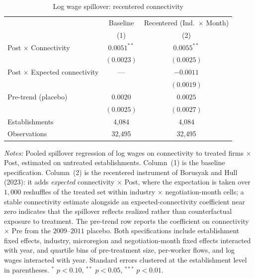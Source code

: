 \begin{table}[H]
\centering
\caption{Log wage spillover: recentered connectivity}
\label{tab:rob_logwages_recentered}
\footnotesize
\begin{tabular}{lcc}
\toprule\toprule
 & Baseline & \shortstack{Recentered\\(Ind.\ $\times$ Month)} \\
 & (1) & (2) \\
\midrule
Post $\times$ Connectivity             & $0.0051^{**}$ & $0.0055^{**}$ \\
                                       & $(0.0023)$ & $(0.0025)$ \\[2pt]
Post $\times$ Expected connectivity    & ---   & $-0.0011$ \\
                                       &       & $(0.0019)$ \\[4pt]
\quad Pre-trend (placebo)              & $0.0020$ & $0.0025$ \\
                                       & $(0.0025)$ & $(0.0027)$ \\
\midrule
Establishments                         & 4,084 & 4,084 \\
Observations                           & 32,495 & 32,495 \\
\bottomrule\bottomrule
\end{tabular}

\begin{minipage}{0.9\linewidth}
\scriptsize\vspace{4pt}
\textit{Notes:} Pooled spillover regression of log wages on connectivity to
treated firms $\times$ Post, estimated on untreated establishments. Column~(1) is
the baseline specification. Column~(2) is the recentered instrument of Borusyak
and Hull (2023): it adds \emph{expected} connectivity $\times$ Post, where the
expectation is taken over $1{,}000$ reshuffles of the treated set within
industry $\times$ negotiation-month cells; a stable connectivity estimate
alongside an expected-connectivity coefficient near zero indicates that the
spillover reflects realized rather than counterfactual exposure to treatment.
The pre-trend row reports the coefficient on connectivity $\times$ Pre from the
$2009$--$2011$ placebo. Both specifications include
establishment fixed effects, industry, microregion and negotiation-month fixed
effects interacted with year, and quartile bins of pre-treatment size,
per-worker flows, and log wages interacted with year. Standard errors clustered
at the establishment level in parentheses. $^{*}$ $p<0.10$, $^{**}$ $p<0.05$,
$^{***}$ $p<0.01$.
\end{minipage}
\end{table}
